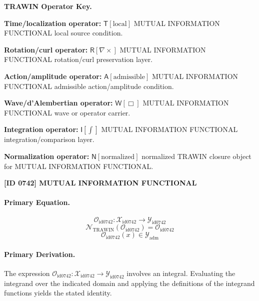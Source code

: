 \par\vspace{0.45\baselineskip}
\noindent\begin{minipage}[t]{\linewidth}
\begingroup
\small
\raggedright
\textbf{TRAWIN Operator Key.}\par
\noindent\textbf{Time/localization operator:} $\mathsf{T}\!\left[\mathrm{local}\right]$ MUTUAL INFORMATION FUNCTIONAL local source condition.\par
\noindent\textbf{Rotation/curl operator:} $\mathsf{R}\!\left[\nabla\times\right]$ MUTUAL INFORMATION FUNCTIONAL rotation/curl preservation layer.\par
\noindent\textbf{Action/amplitude operator:} $\mathsf{A}\!\left[\mathrm{admissible}\right]$ MUTUAL INFORMATION FUNCTIONAL admissible action/amplitude condition.\par
\noindent\textbf{Wave/d'Alembertian operator:} $\mathsf{W}\!\left[\Box\right]$ MUTUAL INFORMATION FUNCTIONAL wave or operator carrier.\par
\noindent\textbf{Integration operator:} $\mathsf{I}\!\left[\int\right]$ MUTUAL INFORMATION FUNCTIONAL integration/comparison layer.\par
\noindent\textbf{Normalization operator:} $\mathsf{N}\!\left[\mathrm{normalized}\right]$ normalized TRAWIN closure object for MUTUAL INFORMATION FUNCTIONAL.\par
\endgroup
\end{minipage}

\clearpage
\noindent\textbf{[ID 0742] MUTUAL INFORMATION FUNCTIONAL}\par
\vspace{0.35em}
\paragraph{Primary Equation.}
\[
\mathcal{O}_{\mathrm{id0742}}:\mathcal{X}_{\mathrm{id0742}}\longrightarrow\mathcal{Y}_{\mathrm{id0742}}
\]
\[
\mathcal{N}_{\mathrm{TRAWIN}}(\mathcal{O}_{\mathrm{id0742}})=\mathcal{O}_{\mathrm{id0742}}
\]
\[
\mathcal{O}_{\mathrm{id0742}}(x)\in\mathcal{Y}_{\mathrm{adm}}
\]

\paragraph{Primary Derivation.}
The expression \( \mathcal{O}_{\mathrm{id0742}}:\mathcal{X}_{\mathrm{id0742}}\longrightarrow\mathcal{Y}_{\mathrm{id0742}} \) involves an integral. Evaluating the integrand over the indicated domain and applying the definitions of the integrand functions yields the stated identity.
